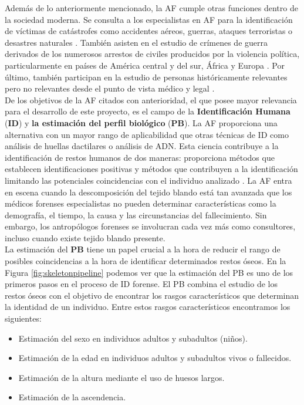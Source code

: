 Además de lo anteriormente mencionado, la AF cumple otras funciones dentro de la sociedad moderna. Se consulta a los especialistas en AF para la identificación de víctimas de catástrofes como accidentes aéreos, guerras, ataques terroristas o desastres naturales \cite{vallejo2009identificacion}. También asisten en el estudio de crímenes de guerra derivados de los numerosos arrestos de civiles producidos por la violencia política, particularmente en países de América central y del sur, África y Europa \cite{casallas2004antropologia}. Por último, también participan en la estudio de personas históricamente relevantes pero no relevantes desde el punto de vista médico y legal  \cite{byers2016introduction}.\\



De los objetivos de la AF citados con anterioridad, el que posee mayor relevancia para el desarrollo de este proyecto, es el campo de la \textbf{Identificación Humana} (\textbf{ID}) y \textbf{la estimación del perfil biológico} (\textbf{PB}). La AF proporciona una alternativa con un mayor rango de aplicabilidad que otras técnicas de ID como análisis de huellas dactilares o análisis de ADN. Esta ciencia contribuye a la identificación de restos humanos de dos maneras: proporciona métodos que establecen identificaciones positivas y métodos que contribuyen a la identificación limitando las potenciales coincidencias con el individuo analizado \cite{mesejo2020survey}. La AF entra en escena cuando la descomposición del tejido blando está tan avanzada que los médicos forenses especialistas no pueden determinar características como la demografía, el tiempo, la causa y las circunstancias del fallecimiento. Sin embargo, los antropólogos forenses se involucran cada vez más como consultores, incluso cuando existe tejido blando presente.\\

La estimación del \textbf{PB} tiene un papel crucial a la hora de reducir el rango de posibles coincidencias a la hora de identificar determinados restos óseos. En la Figura \ref{fig:skeletonpipeline} podemos ver que la estimación del PB es uno de los primeros pasos en el proceso de ID forense. El PB combina el estudio de los restos óseos con el objetivo de encontrar los rasgos característicos que determinan la identidad de un individuo. Entre estos rasgos característicos encontramos los siguientes:

\begin{itemize}
    \item Estimación del sexo en individuos adultos y subadultos (niños).
    \item Estimación de la edad en individuos adultos y subadultos vivos o fallecidos.
    \item Estimación de la altura mediante el uso de huesos largos.
    \item Estimación de la ascendencia.
\end{itemize}

